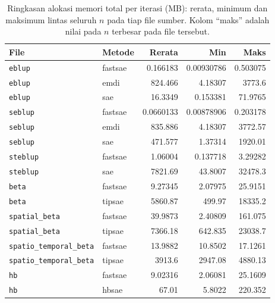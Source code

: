 \begin{table}[htbp]
\centering
\caption{Ringkasan alokasi memori total per iterasi (MB): rerata, minimum dan maksimum lintas seluruh $n$ pada tiap file sumber. Kolom ``maks'' adalah nilai pada $n$ terbesar pada file tersebut.}
\label{tab:mem-summary}
\small
\begin{tabular}{llrrr}
\toprule
File & Metode & Rerata & Min & Maks \\
\midrule
\texttt{eblup} & fastsae & 0.166183 & 0.00930786 & 0.503075 \\
\texttt{eblup} & emdi & 824.466 & 4.18307 &  3773.6 \\
\texttt{eblup} & sae & 16.3349 & 0.153381 & 71.9765 \\
\texttt{seblup} & fastsae & 0.0660133 & 0.00878906 & 0.203178 \\
\texttt{seblup} & emdi & 835.886 & 4.18307 & 3772.57 \\
\texttt{seblup} & sae & 471.577 & 1.37314 & 1920.01 \\
\texttt{steblup} & fastsae & 1.06004 & 0.137718 & 3.29282 \\
\texttt{steblup} & sae & 7821.69 & 43.8007 & 32478.3 \\
\texttt{beta} & fastsae & 9.27345 & 2.07975 & 25.9151 \\
\texttt{beta} & tipsae & 5860.87 &  499.97 & 18335.2 \\
\texttt{spatial\_beta} & fastsae & 39.9873 & 2.40809 & 161.075 \\
\texttt{spatial\_beta} & tipsae & 7366.18 & 642.835 & 23038.7 \\
\texttt{spatio\_temporal\_beta} & fastsae & 13.9882 & 10.8502 & 17.1261 \\
\texttt{spatio\_temporal\_beta} & tipsae &  3913.6 & 2947.08 & 4880.13 \\
\texttt{hb} & fastsae & 9.02316 & 2.06081 & 25.1609 \\
\texttt{hb} & hbsae &   67.01 &  5.8022 & 220.352 \\
\bottomrule
\end{tabular}
\end{table}

